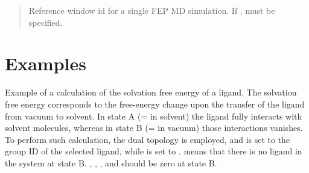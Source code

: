 \documentclass[a4paper,11pt,oneside,english]{sphinxmanual}
\begin{document}
 
\begin{quote}


Reference window id for a single FEP MD simulation.
If ,  must be specified.
\end{quote}


\section{Examples}
\label{\detokenize{20_Alchemy:examples}}
Example of a calculation of the solvation free energy of a ligand.
The solvation free energy corresponds to the free-energy change upon the transfer of the ligand from vacuum to solvent.
In state A (= in solvent) the ligand fully interacts with solvent molecules, whereas in state B (= in vacuum) those interactions vanishes.
To perform such calculation, the dual topology is employed, and  is set to the group ID of the selected ligand, while  is set to .
 means that there is no ligand in the system at state B.
, , , and  should be zero at state B.
\end{document}
